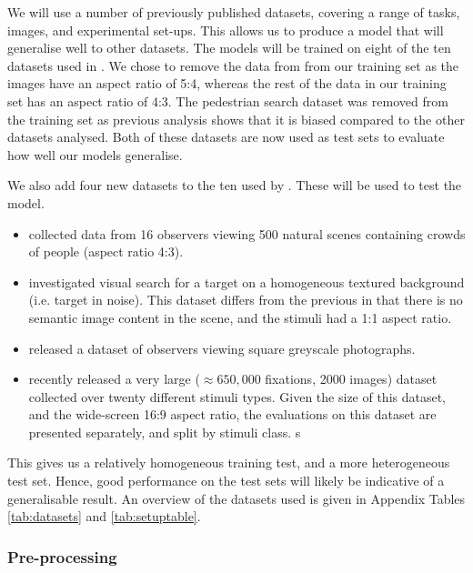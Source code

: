\documentclass[a4paper, twocolumn, oneside, 11pt]{article}
\begin{document}
We will use a number of previously published datasets, covering a range of tasks, images, and experimental set-ups. This allows us to produce a model that will generalise well to other datasets. The models will be trained on eight of the ten datasets used in \cite{clarke-tatler2014}. We chose to remove the data from \cite{asher2013} from our training set as the images have an aspect ratio of 5:4, whereas the rest of the data in our training set has an aspect ratio of 4:3. The pedestrian search dataset \citep{ehinger2009} was removed from the training set as previous analysis \citep{clarke-tatler2014} shows that it is biased compared to the other datasets analysed. Both of these datasets are now used as test sets to evaluate how well our models generalise. 

We also add four new datasets to the ten used by \cite{clarke-tatler2014}. These will be used to test the model. 

\begin{itemize}

\item \cite{jiang2014} collected data from 16 observers viewing 500 natural scenes containing crowds of people (aspect ratio 4:3).

\item \cite{clarke2009} investigated visual search for a target on a homogeneous textured background (i.e. target in noise). This dataset differs from the previous in that there is no semantic image content in the scene, and the stimuli had a 1:1 aspect ratio.

\item \cite{greene-wolfe2012} released a dataset of observers viewing square greyscale photographs.

\item \cite{borji2015} recently released a very large ($\approx 650,000$ fixations, 2000 images) dataset collected over twenty different stimuli types. Given the size of this dataset, and the wide-screen 16:9 aspect ratio, the evaluations on this dataset are presented separately, and split by stimuli class.
s
\end{itemize}
This gives us a relatively homogeneous training test, and a more heterogeneous test set. Hence, good performance on the test sets will likely be indicative of a generalisable result. An overview of the datasets used is given in Appendix Tables \ref{tab:datasets} and \ref{tab:setuptable}. 

\subsubsection{Pre-processing}
\end{document}
